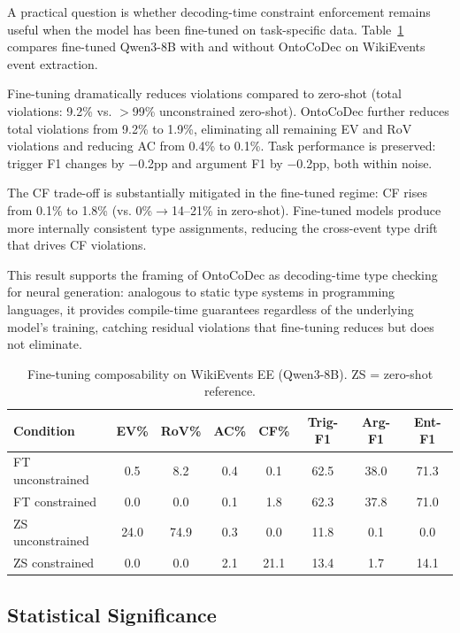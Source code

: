 \documentclass[11pt,a4paper]{article}
\begin{document}
A practical question is whether decoding-time constraint enforcement remains useful when the model has been fine-tuned on task-specific data. Table~\ref{tab:ft-composability} compares fine-tuned Qwen3-8B with and without OntoCoDec on WikiEvents event extraction.

Fine-tuning dramatically reduces violations compared to zero-shot (total violations: 9.2\% vs. $>$99\% unconstrained zero-shot). OntoCoDec further reduces total violations from 9.2\% to 1.9\%, eliminating all remaining EV and RoV violations and reducing AC from 0.4\% to 0.1\%. Task performance is preserved: trigger F1 changes by $-$0.2pp and argument F1 by $-$0.2pp, both within noise.

The CF trade-off is substantially mitigated in the fine-tuned regime: CF rises from 0.1\% to 1.8\% (vs. 0\%$\to$14--21\% in zero-shot). Fine-tuned models produce more internally consistent type assignments, reducing the cross-event type drift that drives CF violations.

This result supports the framing of OntoCoDec as decoding-time type checking for neural generation: analogous to static type systems in programming languages, it provides compile-time guarantees regardless of the underlying model's training, catching residual violations that fine-tuning reduces but does not eliminate.

\begin{table}[t]
\centering
\caption{Fine-tuning composability on WikiEvents EE (Qwen3-8B). ZS = zero-shot reference.}
\label{tab:ft-composability}
\small
\begin{tabular}{lccccccc}
\toprule
Condition & EV\% & RoV\% & AC\% & CF\% & Trig-F1 & Arg-F1 & Ent-F1 \\
\midrule
FT unconstrained & 0.5 & 8.2 & 0.4 & 0.1 & 62.5 & 38.0 & 71.3 \\
FT constrained & 0.0 & 0.0 & 0.1 & 1.8 & 62.3 & 37.8 & 71.0 \\
\midrule
ZS unconstrained & 24.0 & 74.9 & 0.3 & 0.0 & 11.8 & 0.1 & 0.0 \\
ZS constrained & 0.0 & 0.0 & 2.1 & 21.1 & 13.4 & 1.7 & 14.1 \\
\bottomrule
\end{tabular}
\end{table}

\subsection{Statistical Significance}
\end{document}
